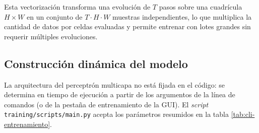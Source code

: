 Esta vectorización transforma una evolución de $T$ pasos sobre una cuadrícula $H \times W$ en un conjunto de $T \cdot H \cdot W$ muestras independientes, lo que multiplica la cantidad de datos por celdas evaluadas y permite entrenar con lotes grandes sin requerir múltiples evoluciones.

\subsection{Construcción dinámica del modelo}

La arquitectura del perceptrón multicapa no está fijada en el código: se determina en tiempo de ejecución a partir de los argumentos de la línea de comandos (o de la pestaña de entrenamiento de la GUI). El \textit{script} \texttt{training/scripts/main.py} acepta los parámetros resumidos en la tabla \ref{tab:cli-entrenamiento}.


